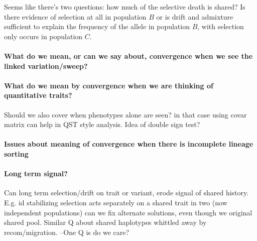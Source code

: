 \documentclass[a4paper,10pt]{article}
\begin{document}
Seems like there's two questions: how much of
the selective death is shared? Is there evidence of selection at all
in population $B$ or is drift and admixture sufficient to explain the
frequency of the allele in population $B$, with selection only occurs
in population $C$.

\paragraph{What do we mean, or can we say about, convergence when we see the linked variation/sweep?}

\paragraph{What do we mean by convergence when we are thinking of quantitative traits?}
Should we also cover when phenotypes alone are seen? in that case using covar matrix can help in QST style analysis.
Idea of double sign test?



\paragraph{Issues about meaning of convergence when there is incomplete lineage sorting} 


\paragraph{Long term signal?}
Can long term selection/drift on trait or variant, erode signal of shared
history. E.g. id stabilizing selection acts separately on a shared
trait in two (now independent populations) can we fix alternate
solutions, even though we original shared pool. Similar Q about shared
haplotypes whittled away by recom/migration. 
--One Q is do we care? 
\end{document}
